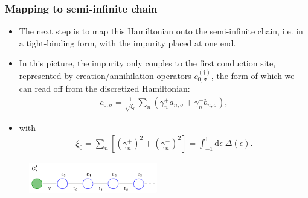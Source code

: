 \documentclass{beamer}
\newcommand{\dd}{\mathrm{d}}
\begin{document}
\begin{frame}
  \frametitle{Mapping to semi-infinite chain}

  \begin{itemize}
  \item The next step is to map this Hamiltonian onto the semi-infinite chain, i.e. in a tight-binding form, with the impurity placed at one end.
  \item In this picture, the impurity only couples to the first conduction site, represented by creation/annihilation operators $c^{(\dagger)}_{0,\sigma}$, the form of which we can read off from the discretized Hamiltonian:
    \begin{gather*}
      c_{0,\sigma} = \frac{1}{\sqrt{\xi_0}}\sum_n(\gamma^+_n a_{n,\sigma} + \gamma^-_n b_{n,\sigma}),
    \end{gather*}
  \item with
    \begin{gather*}
      \xi_0 = \sum_n \left[ (\gamma^+_n)^2 + (\gamma^-_n)^2 \right] = \int_{-1}^1 \dd\epsilon \; \Delta(\epsilon).
    \end{gather*}
  \end{itemize}

  \begin{figure}
    \centering
    \includegraphics[width=0.5\textwidth]{./gfx/nrg-c.png}
  \end{figure}
\end{frame}
\end{document}
